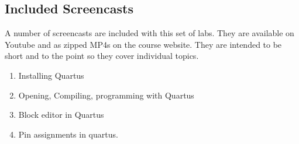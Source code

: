 \documentclass[12pt,journal]{IEEEtran}
\begin{document}
    \subsection{Included Screencasts}
      A number of screencasts are included with this set of labs. They are available on Youtube and as zipped MP4s
      on the course website. They are intended to be short and to the point so they cover individual topics.
      \begin{enumerate}
        \item Installing Quartus
        \item Opening, Compiling, programming with Quartus
        \item Block editor in Quartus
        \item Pin assignments in quartus.
      \end{enumerate}
  
\end{document}
